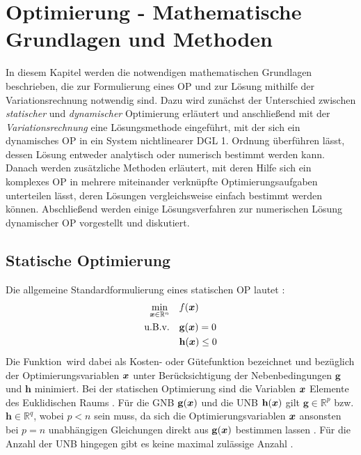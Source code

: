 \chapter{Optimierung - Mathematische Grundlagen und Methoden}\label{cha:Optimierung}
In diesem Kapitel werden die notwendigen mathematischen Grundlagen beschrieben, die zur Formulierung eines \gls{OP} und zur Lösung mithilfe der Variationsrechnung notwendig sind. Dazu wird zunächst der Unterschied zwischen \textit{statischer} und \textit{dynamischer} Optimierung erläutert und anschließend mit der \textit{Variationsrechnung} eine Lösungsmethode eingeführt, mit der sich ein dynamisches \gls{OP} in ein System nichtlinearer \gls{DGL} 1. Ordnung überführen lässt, dessen Lösung entweder analytisch oder numerisch bestimmt werden kann. Danach werden zusätzliche Methoden erläutert, mit deren Hilfe sich ein komplexes \gls{OP} in mehrere miteinander verknüpfte Optimierungsaufgaben unterteilen lässt, deren Lösungen vergleichsweise einfach bestimmt werden können. Abschließend werden einige Lösungsverfahren zur numerischen Lösung dynamischer \gls{OP} vorgestellt und diskutiert. 
\section{Statische Optimierung}\label{sec:statischeOpt}
Die allgemeine Standardformulierung eines statischen \gls{OP} lautet \cite{KnutGraichen.2012}:
\begin{align}
	\min_{\boldsymbol{x}\in\mathbb{R}^n} \quad &f(\boldsymbol{x}) \label{eq:J_statisch}\\
	\textrm{u.B.v.} \quad&\mathbf{g}(\boldsymbol{x}) = 0 \label{eq:GNB_statisch}\\
	&\mathbf{h}(\boldsymbol{x}) \leq 0 \label{eq:UNB_statisch}
\end{align}
Die Funktion \fofx\,wird dabei als Kosten- oder Gütefunktion bezeichnet und bezüglich der Optimierungsvariablen $\boldsymbol{x}$ unter Berücksichtigung der Nebenbedingungen $\mathbf{g}$ und $\mathbf{h}$ minimiert. Bei der statischen Optimierung sind die Variablen $\boldsymbol{x}$ Elemente des Euklidischen Raums \cite{KnutGraichen.2012}. Für die \gls{GNB} $\mathbf{g}(\boldsymbol{x})$ und die \gls{UNB} $\mathbf{h}(\boldsymbol{x})$ gilt $\mathbf{g}\in\mathbb{R}^p$ bzw. $\mathbf{h}\in\mathbb{R}^q$, wobei $p<n$ sein muss, da sich die Optimierungsvariablen $\boldsymbol{x}$ ansonsten bei $p=n$ unabhängigen Gleichungen direkt aus $\mathbf{g}(\boldsymbol{x})$ bestimmen lassen \cite{Papageorgiou.2012}. Für die Anzahl der \gls{UNB} hingegen gibt es keine maximal zulässige Anzahl \cite{Papageorgiou.2012}.

